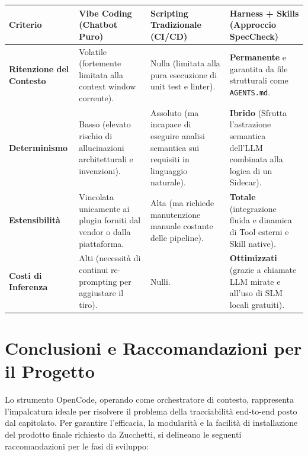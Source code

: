 \documentclass[a4paper, 11pt]{article}
\begin{document}
\vspace{0.3cm}
\noindent
\begin{tabularx}{\textwidth}{|X|X|X|X|}
    \hline
    \textbf{Criterio} & \textbf{Vibe Coding (Chatbot Puro)} & \textbf{Scripting Tradizionale (CI/CD)} & \textbf{Harness + Skills (Approccio SpecCheck)} \\ \hline
    \textbf{Ritenzione del Contesto} & Volatile (fortemente limitata alla context window corrente). & Nulla (limitata alla pura esecuzione di unit test e linter). & \textbf{Permanente} e garantita da file strutturali come \texttt{AGENTS.md}. \\ \hline
    \textbf{Determinismo} & Basso (elevato rischio di allucinazioni architetturali e invenzioni). & Assoluto (ma incapace di eseguire analisi semantica sui requisiti in linguaggio naturale). & \textbf{Ibrido} (Sfrutta l'astrazione semantica dell'LLM combinata alla logica di un Sidecar). \\ \hline
    \textbf{Estensibilità} & Vincolata unicamente ai plugin forniti dal vendor o dalla piattaforma. & Alta (ma richiede manutenzione manuale costante delle pipeline). & \textbf{Totale} (integrazione fluida e dinamica di Tool esterni e Skill native). \\ \hline
    \textbf{Costi di Inferenza} & Alti (necessità di continui re-prompting per aggiustare il tiro). & Nulli. & \textbf{Ottimizzati} (grazie a chiamate LLM mirate e all'uso di SLM locali gratuiti). \\ \hline
\end{tabularx}
\vspace{0.3cm}

\section{Conclusioni e Raccomandazioni per il Progetto}

Lo strumento OpenCode, operando come orchestratore di contesto, rappresenta l'impalcatura ideale per risolvere il problema della tracciabilità end-to-end posto dal capitolato. Per garantire l'efficacia, la modularità e la facilità di installazione del prodotto finale richiesto da Zucchetti, si delineano le seguenti raccomandazioni per le fasi di sviluppo:
\end{document}
